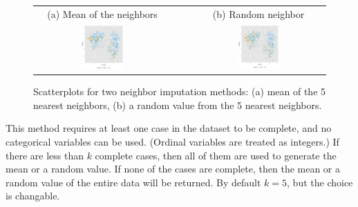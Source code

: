 \documentclass[article]{jss}
\begin{document}
\begin{center}
\begin{figure}[h]
\begin{centering}
\begin{tabular}{cccc}
{\tiny{(a) Mean of the neighbors}} &  &  & {\tiny{(b) Random neighbor}}\tabularnewline
\includegraphics[width=0.32\textwidth]{graph/fig3-5-knn} &  &  & \includegraphics[width=0.32\textwidth]{graph/fig3-5-knn-2}\tabularnewline
\end{tabular}
\par\end{centering}
\caption{Scatterplots for two neighbor imputation methods: (a) mean of the 5 nearest neighbors, (b) a random value from the 5 nearest neighbors.}
\label{fig:neighbor-imputation}
\end{figure}
\par\end{center}


This method requires at least one case in the dataset to be complete, and no categorical variables can be used. (Ordinal variables are treated as integers.) If there are less than $k$ complete cases, then all of them are used to generate the mean or a random value. If none of the cases are complete, then the mean or a random value of the entire data will be returned. By default $k=5$, but the choice is changable.

\end{document}
